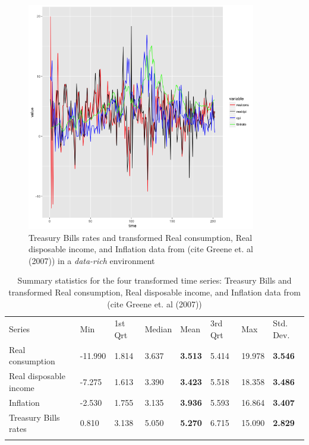 \begin{figure}[!htb]
\centering
\includegraphics[width=10cm]{gfx/chapter-rvfl-ensembles/all_series.png}
\caption{Treasury Bills rates and transformed Real consumption, Real disposable income, and  Inflation data from (cite Greene et. al (2007)) in a \textit{data-rich} environment}
\label{all_series_plot}
\end{figure}


\begin{table}[!htb]
\begin{center}
\caption{Summary statistics for the four transformed time series: Treasury Bills and transformed Real consumption, Real disposable income, and  Inflation data from (cite Greene et. al (2007))}
\label{tab:summary_four_ts}       %
\begin{tabular}{llllllll}
\hline\noalign{\smallskip}
Series & Min & 1st Qrt  & Median  & Mean & 3rd Qrt  & Max & Std. Dev.\\
\noalign{\smallskip}\hline\noalign{\smallskip}
  Real consumption  & -11.990 & 1.814 & 3.637 & \textbf{3.513} & 5.414 & 19.978 & \textbf{3.546}\\
  Real disposable income  & -7.275 & 1.613 & 3.390 & \textbf{3.423} & 5.518 & 18.358 & \textbf{3.486}\\
  Inflation & -2.530  & 1.755 & 3.135 & \textbf{3.936} & 5.593 & 16.864 & \textbf{3.407}\\
  Treasury Bills rates & 0.810  & 3.138 & 5.050 & \textbf{5.270} & 6.715 & 15.090 & \textbf{2.829} \\
\noalign{\smallskip}\hline
\end{tabular}
\end{center}
\end{table}


